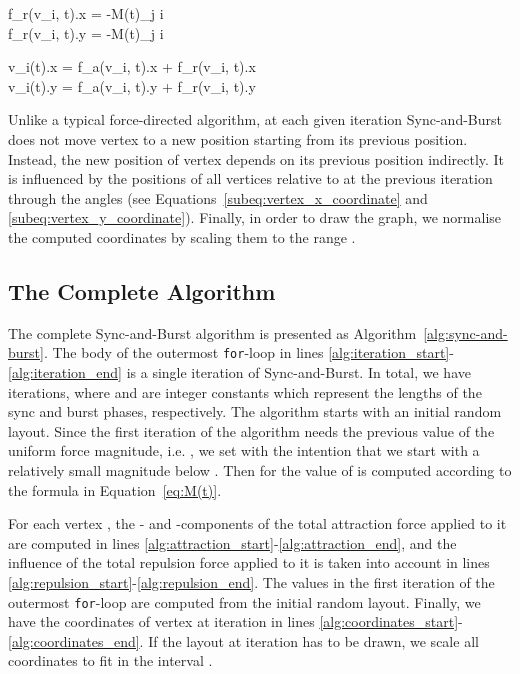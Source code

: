 \documentclass{llncs}
\begin{document}
f_r(v_i, t).x = -M(t)\sum_{j \neq i}\label{subeq:fr_x_component}\\
f_r(v_i, t).y = -M(t)\sum_{j \neq i}\label{subeq:fr_y_component}



v_{i}(t).x = f_a(v_i, t).x + f_r(v_i, t).x\label{subeq:vertex_x_coordinate}\\
v_{i}(t).y = f_a(v_i, t).y + f_r(v_i, t).y\label{subeq:vertex_y_coordinate}


Unlike a typical force-directed algorithm, at each given iteration Sync-and-Burst does not move vertex  to a new position starting from its previous position. Instead, the new position of vertex  depends on its previous position indirectly. It is influenced by the positions of all vertices relative to  at the previous iteration through the angles  (see Equations~\eqref{subeq:vertex_x_coordinate} and \eqref{subeq:vertex_y_coordinate}). Finally, in order to draw the graph, we normalise the computed coordinates by scaling them to the range .

\subsection{The Complete Algorithm} \label{sec:pseudocode}

The complete Sync-and-Burst algorithm is presented as Algorithm~\ref{alg:sync-and-burst}. The body of the outermost \texttt{for}-loop in lines \ref{alg:iteration_start}-\ref{alg:iteration_end} is a single iteration of Sync-and-Burst. In total, we have  iterations, where  and  are integer constants which represent the lengths of the sync and burst phases, respectively. The algorithm starts with an initial random layout. Since the first iteration of the algorithm needs the previous value of the uniform force magnitude, i.e. , we set  with the intention that we start with a relatively small magnitude below . Then for  the value of  is computed according to the formula in Equation~\eqref{eq:M(t)}.

For each vertex , the - and -components of the total attraction force applied to it are computed in lines \ref{alg:attraction_start}-\ref{alg:attraction_end}, and the influence of the total repulsion force applied to it is taken into account in lines \ref{alg:repulsion_start}-\ref{alg:repulsion_end}. The values  in the first iteration of the outermost \texttt{for}-loop are computed from the initial random layout. Finally, we have the coordinates of vertex  at iteration  in lines \ref{alg:coordinates_start}-\ref{alg:coordinates_end}. If the layout at iteration  has to be drawn, we scale all coordinates to fit in the interval .
\end{document}
